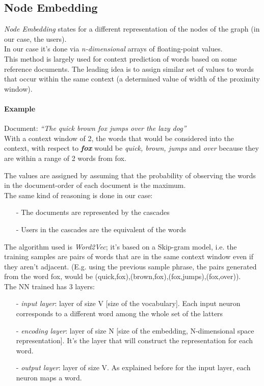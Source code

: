 \documentclass{article}
\newcommand\tab[1][1cm]{\hspace*{#1}}
\begin{document}
		\subsection{Node Embedding}
			\textit{Node Embedding} states for a different representation of the nodes of the graph (in our case, the users).\\
			In our case it's done via \textit{n-dimensional} arrays of floating-point values.\\
			This method is largely used for context prediction of words based on some reference documents. The leading idea is to assign similar set of values to words that occur within the same context (a determined value of width of the proximity window).\\
			\paragraph{Example}
			\begin{addmargin}[1em]{0em}
	            \medskip
				\tab Document: \textit{\textquotedblleft The quick brown fox jumps over the lazy dog\textquotedblright}\smallskip \\
				With a context window of 2, the words that would be considered into the context, with respect to \textit{\textbf{fox}} would be \textit{quick, brown, jumps} and \textit{over} because they are within a range of 2 words from fox.
			\end{addmargin}
			The values are assigned by assuming that the probability of observing the words in the document-order of each document is the maximum.\\
			The same kind of reasoning is done in our case:
			\begin{itemize}
				\item [-] The documents are represented by the cascades
				\item [-] Users in the cascades are the equivalent of the words
			\end{itemize}
			The algorithm used is \textit{Word2Vec}; it's based on a Skip-gram model, i.e. the training samples are pairs of words that are in the same context window even if they aren't adjacent. (E.g. using the previous sample phrase, the pairs generated from the word fox, would be (quick,fox),(brown,fox),(fox,jumps),(fox,over)).\\
			The NN trained has 3 layers:
			\begin{itemize}
				\item [-] \textit{input layer}: layer of size V [size of the vocabulary]. Each input neuron corresponds to a different word among the whole set of the latters
				\item [-] \textit{encoding layer}: layer of size N [size of the embedding, N-dimensional space representation]. It's the layer that will construct the representation for each word.
				\item [-] \textit{output layer}: layer of size V. As explained before for the input layer, each neuron maps a word.
			\end{itemize}
\end{document}
